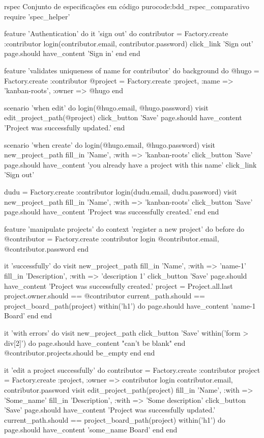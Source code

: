 \begin{mycode}{rspec}%
{Conjunto de especificações em código puro}{code:bdd_rspec_comparativo}
require 'spec_helper'

feature 'Authentication' do
  it 'sign out' do
    contributor = Factory.create :contributor
    login(contributor.email, contributor.password)
    click_link 'Sign out'
    page.should have_content 'Sign in'
  end
end

feature 'validates uniqueness of name for contributor' do
  background do
    @hugo = Factory.create :contributor
    @project = Factory.create :project, :name => 'kanban-roots', :owner => @hugo
  end

  scenario 'when edit' do
    login(@hugo.email, @hugo.password)
    visit edit_project_path(@project)
    click_button 'Save'
    page.should have_content 'Project was successfully updated.'
  end

  scenario 'when create' do
    login(@hugo.email, @hugo.password)
    visit new_project_path
    fill_in 'Name', :with => 'kanban-roots'
    click_button 'Save'
    page.should have_content 'you already have a project with this name'
    click_link 'Sign out'

    dudu = Factory.create :contributor
    login(dudu.email, dudu.password)
    visit new_project_path
    fill_in 'Name', :with => 'kanban-roots'
    click_button 'Save'
    page.should have_content 'Project was successfully created.'
  end
end

feature 'manipulate projects' do
  context 'register a new project' do
    before do
      @contributor = Factory.create :contributor
      login @contributor.email, @contributor.password
    end

    it 'successfully' do
      visit new_project_path
      fill_in 'Name', :with => 'name-1'
      fill_in 'Description', :with => 'description 1'
      click_button 'Save'
      page.should have_content 'Project was successfully created.'
      project = Project.all.last
      project.owner.should == @contributor
      current_path.should == project_board_path(project)
      within('h1') do
        page.should have_content 'name-1 Board'
      end
    end

    it 'with errors' do
      visit new_project_path
      click_button 'Save'
      within('form > div[2]') do
        page.should have_content "can't be blank"
      end
      @contributor.projects.should be_empty
    end
  end

  it 'edit a project successfully' do
    contributor = Factory.create :contributor
    project = Factory.create :project, :owner => contributor
    login contributor.email, contributor.password
    visit edit_project_path(project)
    fill_in 'Name', :with => 'Some_name'
    fill_in 'Description', :with => 'Some description'
    click_button 'Save'
    page.should have_content 'Project was successfully updated.'
    current_path.should == project_board_path(project)
    within('h1') do
      page.should have_content 'some_name Board'
    end
  end


\end{mycode}
